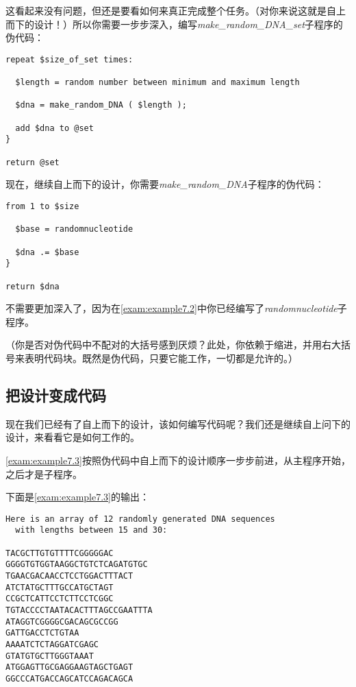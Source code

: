 这看起来没有问题，但还是要看如何来真正完成整个任务。（对你来说这就是自上而下的设计！）所以你需要一步步深入，编写\textit{make\_random\_DNA\_set}子程序的伪代码：

\begin{lstlisting}
repeat $size_of_set times:

  $length = random number between minimum and maximum length

  $dna = make_random_DNA ( $length );

  add $dna to @set
}

return @set
\end{lstlisting}

现在，继续自上而下的设计，你需要\textit{make\_random\_DNA}子程序的伪代码：

\begin{lstlisting}
from 1 to $size

  $base = randomnucleotide

  $dna .= $base
}

return $dna
\end{lstlisting}

不需要更加深入了，因为在\autoref{exam:example7.2}中你已经编写了\textit{randomnucleotide}子程序。

（你是否对伪代码中不配对的大括号感到厌烦？此处，你依赖于缩进，并用右大括号来表明代码块。既然是伪代码，只要它能工作，一切都是允许的。）

\subsection{把设计变成代码}
现在我们已经有了自上而下的设计，该如何编写代码呢？我们还是继续自上问下的设计，来看看它是如何工作的。

\autoref{exam:example7.3}按照伪代码中自上而下的设计顺序一步步前进，从主程序开始，之后才是子程序。



下面是\autoref{exam:example7.3}的输出：

\begin{lstlisting}
Here is an array of 12 randomly generated DNA sequences
  with lengths between 15 and 30:

TACGCTTGTGTTTTCGGGGGAC
GGGGTGTGGTAAGGCTGTCTCAGATGTGC
TGAACGACAACCTCCTGGACTTTACT
ATCTATGCTTTGCCATGCTAGT
CCGCTCATTCCTCTTCCTCGGC
TGTACCCCTAATACACTTTAGCCGAATTTA
ATAGGTCGGGGCGACAGCGCCGG
GATTGACCTCTGTAA
AAAATCTCTAGGATCGAGC
GTATGTGCTTGGGTAAAT
ATGGAGTTGCGAGGAAGTAGCTGAGT
GGCCCATGACCAGCATCCAGACAGCA
\end{lstlisting}

